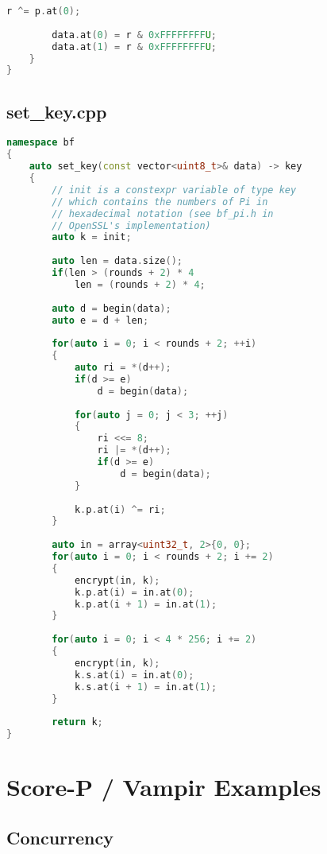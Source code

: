 \begin{appendix}
\begin{lstlisting}[language=C++]
        r ^= p.at(0);
        
        data.at(0) = r & 0xFFFFFFFFU;
        data.at(1) = r & 0xFFFFFFFFU;
    }
}
\end{lstlisting}

\subsection{set\_key.cpp}

\begin{lstlisting}[language=C++]
namespace bf
{
    auto set_key(const vector<uint8_t>& data) -> key
    {
        // init is a constexpr variable of type key
        // which contains the numbers of Pi in
        // hexadecimal notation (see bf_pi.h in
        // OpenSSL's implementation)
        auto k = init;
        
        auto len = data.size();
        if(len > (rounds + 2) * 4
            len = (rounds + 2) * 4;
            
        auto d = begin(data);
        auto e = d + len;
        
        for(auto i = 0; i < rounds + 2; ++i)
        {
            auto ri = *(d++);
            if(d >= e)
                d = begin(data);
                
            for(auto j = 0; j < 3; ++j)
            {
                ri <<= 8;
                ri |= *(d++);
                if(d >= e)
                    d = begin(data);
            }
            
            k.p.at(i) ^= ri;
        }
        
        auto in = array<uint32_t, 2>{0, 0};
        for(auto i = 0; i < rounds + 2; i += 2)
        {
            encrypt(in, k);
            k.p.at(i) = in.at(0);
            k.p.at(i + 1) = in.at(1);
        }
        
        for(auto i = 0; i < 4 * 256; i += 2)
        {
            encrypt(in, k);
            k.s.at(i) = in.at(0);
            k.s.at(i + 1) = in.at(1);
        }
        
        return k;
}
\end{lstlisting}

\section{Score-P / Vampir Examples}\label{app:scorep}

\subsection{Concurrency}\label{app:scorep_conc}


\end{appendix}
